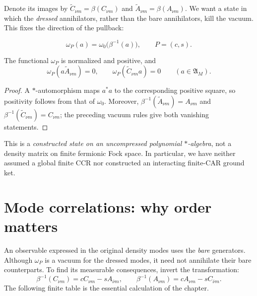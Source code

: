 Denote its images by
$\widetilde C_{\nu m}=\beta(C_{\nu m})$ and
$\widetilde A_{\nu m}=\beta(A_{\nu m})$.  We want a state in which
the \emph{dressed} annihilators, rather than the bare annihilators,
kill the vacuum.  This fixes the direction of the pullback:
\begin{definition}
\label{def:ch19-dressed-functional}
\begin{equation}
 \boxed{\omega_P(a)=\omega_0\bigl(\beta^{-1}(a)\bigr),
 \qquad P=(c,s).}
 \label{eq:ch19-dressed-state}
\end{equation}
\end{definition}

\begin{proposition}
\label{prop:ch19-dressed-positive}
The functional $\omega_P$ is normalized and positive, and
\begin{equation}
 \omega_P(a\widetilde A_{\nu m})=0,
 \qquad \omega_P(\widetilde C_{\nu m}a)=0
 \qquad (a\in\mathfrak A_M).
 \label{eq:ch19-dressed-annihilation}
\end{equation}
\end{proposition}
\begin{proof}
A $*$-automorphism maps $a^*a$ to the corresponding positive
square, so positivity follows from that of $\omega_0$.  Moreover,
$\beta^{-1}(\widetilde A_{\nu m})=A_{\nu m}$ and
$\beta^{-1}(\widetilde C_{\nu m})=C_{\nu m}$; the preceding vacuum
rules give both vanishing statements.
\end{proof}

This is a \emph{constructed state on an uncompressed polynomial
$*$-algebra}, not a density matrix on finite fermionic Fock space.
In particular, we have neither assumed a global finite CCR nor
constructed an interacting finite-CAR ground ket.

\section{Mode correlations: why order matters}
\label{sec:ch19-mode-correlators}

An observable expressed in the original density modes uses the
\emph{bare} generators.  Although $\omega_P$ is a vacuum for the
dressed modes, it need not annihilate their bare counterparts.
To find its measurable consequences, invert the transformation:
\[
 \beta^{-1}(C_{\nu m})=cC_{\nu m}-sA_{\bar\nu m},
 \qquad
 \beta^{-1}(A_{\nu m})=cA_{\nu m}-sC_{\bar\nu m}.
\]
The following finite table is the essential calculation of the chapter.

